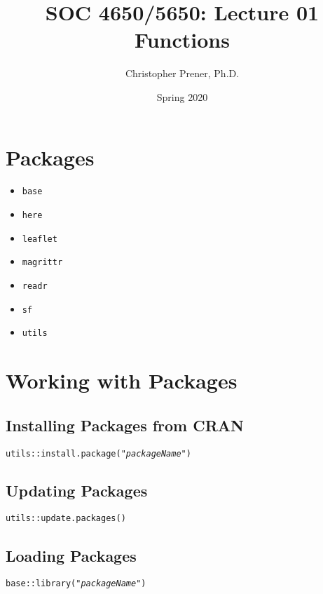 \documentclass{tufte-handout}
\title{SOC 4650/5650: Lecture 01 Functions}
\author{Christopher Prener, Ph.D.}
\date{Spring 2020}
\newenvironment{subs}
  {\adjustwidth{3em}{0pt}}
  {\endadjustwidth}
\begin{document}
\maketitle %

\vspace{5mm}
\section{Packages}
\begin{itemize}
\item \texttt{base}
\item \texttt{here}
\item \texttt{leaflet}
\item \texttt{magrittr}
\item \texttt{readr}
\item \texttt{sf}
\item \texttt{utils}
\end{itemize}

\vspace{2mm}
\section{Working with Packages}
\begin{subs}
\subsection{Installing Packages from CRAN}
\texttt{utils::}{\color{red}\texttt{install.package}}\texttt{("\textit{packageName}")}

\vspace{3mm}
\subsection{Updating Packages}
\texttt{utils::}{\color{red}\texttt{update.packages}}\texttt{()}

\vspace{3mm}
\subsection{Loading Packages}
\texttt{base::}{\color{red}\texttt{library}}\texttt{("\textit{packageName}")}

\end{subs}
\end{document}
